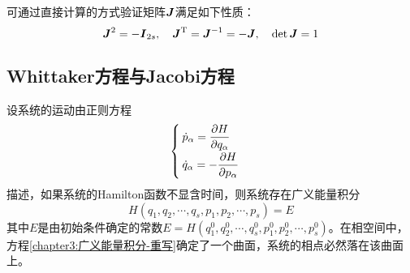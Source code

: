 可通过直接计算的方式验证矩阵$\boldsymbol{J}$满足如下性质：
\begin{equation}
	\boldsymbol{J}^2 = -\boldsymbol{I}_{2s},\quad \boldsymbol{J}^{\mathrm{T}} = \boldsymbol{J}^{-1} = -\boldsymbol{J},\quad \det \boldsymbol{J} = 1
\end{equation}

\subsection{Whittaker方程与Jacobi方程}

设系统的运动由正则方程
\begin{equation}
\begin{cases}
	\dot{p}_\alpha= \dfrac{\partial H}{\partial q_\alpha} \\[1.5ex]
	\dot{q}_\alpha= -\dfrac{\partial H}{\partial p_\alpha}
\end{cases}
\label{chapter3:正则方程-重写}
\end{equation}
描述，如果系统的Hamilton函数不显含时间，则系统存在广义能量积分
\begin{equation}
	H(q_1,q_2,\cdots,q_s,p_1,p_2,\cdots,p_s) = E
	\label{chapter3:广义能量积分-重写}
\end{equation}
其中$E$是由初始条件确定的常数$E=H(q_1^0,q_2^0,\cdots,q_s^0,p_1^0,p_2^0,\cdots,p_s^0)$。在相空间中，方程\eqref{chapter3:广义能量积分-重写}确定了一个曲面，系统的相点必然落在该曲面上。


